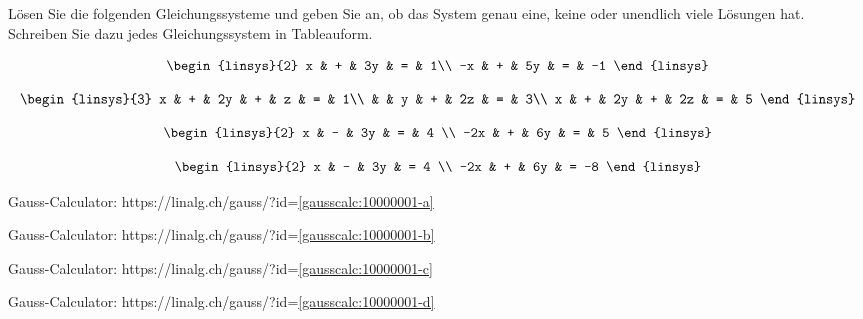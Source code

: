 Lösen Sie die folgenden Gleichungssysteme und geben Sie an,
ob das System genau eine, keine oder unendlich viele Lösungen
hat. Schreiben Sie dazu jedes Gleichungssystem in Tableauform.
\begin{teilaufgaben}
\item
\[
\begin{linsys}{2}
 x & + & 3y & = &  1\\
-x & + & 5y & = & -1
\end{linsys}
\]
\item
\[
\begin{linsys}{3}
x & + & 2y & + &  z & = & 1\\
  &   &  y & + & 2z & = & 3\\
x & + & 2y & + & 2z & = & 5 
\end{linsys}
\]
\item
\[
\begin{linsys}{2}
  x & - & 3y & = & 4 \\
-2x & + & 6y & = & 5
\end{linsys}
\]
\item
\[
\begin{linsys}{2}
  x & - & 3y & =  4 \\
-2x & + & 6y & = -8
\end{linsys}
\]
\end{teilaufgaben}

\begin{hinweis}
\begin{teilaufgaben}
\item Gauss-Calculator: https://linalg.ch/gauss/?id=\ref{gausscalc:10000001-a}
\item Gauss-Calculator: https://linalg.ch/gauss/?id=\ref{gausscalc:10000001-b}
\item Gauss-Calculator: https://linalg.ch/gauss/?id=\ref{gausscalc:10000001-c}
\item Gauss-Calculator: https://linalg.ch/gauss/?id=\ref{gausscalc:10000001-d}
\end{teilaufgaben}
\end{hinweis}


